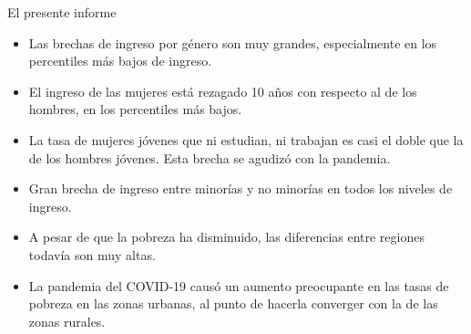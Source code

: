 

    El presente informe
    
    
    
    \begin{tcolorbox}[enhanced,fit to height=10cm, colback=mycolor,colframe=mycolor,drop fuzzy shadow,watermark color=white,
                        title=Principales Resultados]
    \begin{itemize}
        \item Las brechas de ingreso por género son muy grandes, especialmente en los percentiles más bajos de ingreso.
        \item El ingreso de las mujeres está rezagado 10 años con respecto al de los hombres, en los percentiles más bajos.
        \item La tasa de mujeres jóvenes que ni estudian, ni trabajan es casi el doble que la de los hombres jóvenes. Esta brecha se agudizó con la pandemia.
         \item Gran brecha de ingreso entre minorías y no minorías  en todos los niveles de ingreso.
        \item A pesar de que la pobreza ha disminuido, las diferencias entre regiones todavía son muy altas.
        \item La pandemia del COVID-19 causó un aumento preocupante en las tasas de pobreza en las zonas urbanas, al punto de hacerla converger con la de las zonas  rurales.
     \end{itemize}
    \end{tcolorbox}



